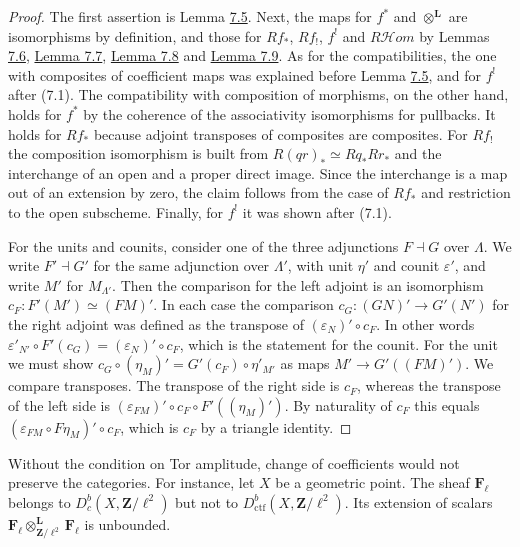 \documentclass[11pt]{article}
\providecommand{\Dbc}{}\renewcommand{\Dbc}{D^b_c}
\providecommand{\cHom}{}\renewcommand{\cHom}{R\mathcal{H}\!om}
\begin{document}
\begin{proof}[{Proof}]\label{bp27}%
The first assertion is Lemma \hyperref[bp14]{7.5}. Next, the maps for \(f^*\) and \(\otimes^{\mathbf L}\) are isomorphisms by definition, and those for \(Rf_*\), \(Rf_!\), \(f^!\) and \(\cHom\) by Lemmas \hyperref[bp16]{7.6}, \hyperref[bp18]{Lemma 7.7}, \hyperref[bp21]{Lemma 7.8} and \hyperref[bp23]{Lemma 7.9}. As for the compatibilities, the one with composites of coefficient maps was explained before Lemma \hyperref[bp14]{7.5}, and for \(f^!\) after (7.1). The compatibility with composition of morphisms, on the other hand, holds for \(f^*\) by the coherence of the associativity isomorphisms for pullbacks. It holds for \(Rf_*\) because adjoint transposes of composites are composites. For \(Rf_!\) the composition isomorphism is built from \(R(qr)_*\simeq Rq_*Rr_*\) and the interchange of an open and a proper direct image. Since the interchange is a map out of an extension by zero, the claim follows from the case of \(Rf_*\) and restriction to the open subscheme. Finally, for \(f^!\) it was shown after (7.1).

For the units and counits, consider one of the three adjunctions \(F\dashv G\) over \(\Lambda\). We write \(F'\dashv G'\) for the same adjunction over \(\Lambda'\), with unit \(\eta'\) and counit \(\varepsilon'\), and write \(M'\) for \(M_{\Lambda'}\). Then the comparison for the left adjoint is an isomorphism \(c_F:F'(M')\simeq(FM)'\). In each case the comparison \(c_G:(GN)'\to G'(N')\) for the right adjoint was defined as the transpose of \((\varepsilon_N)'\circ c_F\). In other words \(\varepsilon'_{N'}\circ F'(c_G)=(\varepsilon_N)'\circ c_F\), which is the statement for the counit. For the unit we must show \(c_G\circ(\eta_M)'=G'(c_F)\circ\eta'_{M'}\) as maps \(M'\to G'((FM)')\). We compare transposes. The transpose of the right side is \(c_F\), whereas the transpose of the left side is \((\varepsilon_{FM})'\circ c_F\circ F'((\eta_M)')\). By naturality of \(c_F\) this equals \((\varepsilon_{FM}\circ F\eta_M)'\circ c_F\), which is \(c_F\) by a triangle identity.
\end{proof}

\label{bp28}%
Without the condition on Tor amplitude, change of coefficients would not preserve the categories. For instance, let \(X\) be a geometric point. The sheaf \(\mathbf F_\ell\) belongs to \(\Dbc(X,\mathbf Z/\ell^2)\) but not to \(D^b_{\mathrm{ctf}}(X,\mathbf Z/\ell^2)\). Its extension of scalars \(\mathbf F_\ell\otimes^{\mathbf L}_{\mathbf Z/\ell^2}\mathbf F_\ell\) is unbounded.
\end{document}
